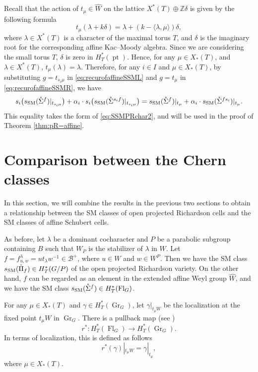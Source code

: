 \documentclass[12pt]{amsart}
\def\SSM{s_{\rm SM}}
\def\Gr{\operatorname{Gr}}
\def\pt{\operatorname{pt}}
\def\Gr{\operatorname{Gr}}
\def\Fl{\operatorname{Fl}}
\def\t{g}
\begin{document}
Recall that the action of $t_\mu\in \widehat{W}$ on the lattice $X^*(T)\oplus \mathbb{Z}\delta$ is given by the following formula
\[t_\mu(\lambda+k\delta)=\lambda+(k-\langle\lambda,\mu\rangle)\delta,\]
where $\lambda\in X^*(T)$ is a character of the maximal torus $T$, and $\delta$ is the imaginary root for the corresponding affine Kac--Moody algebra. Since we are considering the small torus $T$, $\delta$ is zero in $H_T^*(\pt)$. Hence, for any $\mu\in X_*(T)$, and $\lambda\in X^*(T)$, $t_\mu(\lambda)=\lambda$. Therefore, 
for any $i\in I$ and $\mu\in X_*(T)$, 
by substituting $\t=t_{s_i\mu}$ in \eqref{eq:recurofaffineSSML} and $\t=t_\mu$ in 
\eqref{eq:recurofaffineSSMR}, we have 
\begin{equation}\label{equ:affrec}
s_i\big(
    \SSM(\mathring{\Sigma}^{f})|_{t_{s_i\mu}}\big)
+\alpha_i\cdot s_i\big(\SSM(\mathring{\Sigma}^{s_if})|_{t_{s_i\mu}}
    \big)
=
\SSM(\mathring{\Sigma}^{f})|_{t_\mu}
+\alpha_i\cdot \SSM(\mathring{\Sigma}^{fs_i})|_{t_\mu}.
\end{equation}
This equality takes the form of \eqref{eq:SSMPRchar2}, and will be used in the proof of Theorem \ref{thm:pR=affine}.



\section{Comparison between the Chern classes}\label{comparison}

In this section, we will combine the results in the previous two sections to obtain a relationship between the SM classes of  open projected Richardson cells and the SM classes of  affine Schubert cells.

As before, let $\lambda$ be a dominant cocharacter and $P$ be a parabolic subgroup containing $B$ such that $W_P$ is the stabilizer of $\lambda$ in $W$. Let $f=f^\lambda_{u,w}=ut_\lambda w^{-1}\in \mathcal{B}^+$, where $u\in W$ and $w\in W^P$. Then we have the SM class $\SSM(\mathring{\Pi}_f)\in H_T^*(G/P)$ of the open projected Richardson variety. 
On the other hand, $f$ can be regarded as an element in the extended affine Weyl group $\widehat{W}$, and we have the SM class $\SSM(\mathring{\Sigma}^{f})\in H_T^*(\Fl_G)$.

For any $\mu\in X_*(T)$ and $\gamma\in H_T^*(\Gr_G)$, let $\gamma|_{t_\mu W}$ be the localization at the fixed point $t_\mu W$ in $\Gr_G$.
There is a pullback map (see \cite[Proposition 4.4 in Chapter 4]{LLMSSZ14})
\[r^*\colon H_T^*(\Fl_G)\rightarrow H_T^*(\Gr_G).\]
In terms of localization, this is defined as follows
\[r^*(\gamma)|_{t_{\mu}W}=\gamma|_{t_\mu},\]
where $\mu\in X_*(T)$. 
\end{document}
